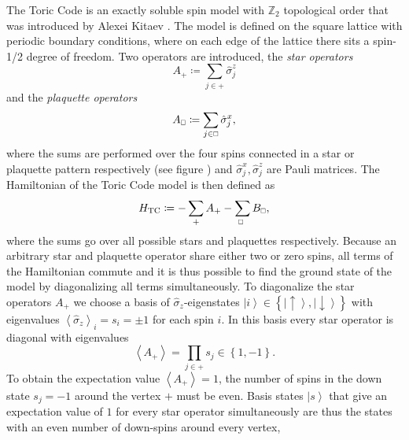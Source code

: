 The Toric Code is an exactly soluble spin model with $\mathbb{Z}_2$ topological order that was introduced by Alexei Kitaev \cite{cite:fault_tolerant_quantum_computation_by_anyons}. The model is defined on the square lattice with periodic boundary conditions, where on each edge of the lattice there sits a spin-1/2 degree of freedom. Two operators are introduced, the \textit{star operators}
\begin{equation}
	\label{eq:star_operator}
	A_+ \coloneqq \sum_{j\in+}\hat{\sigma}_j^z
\end{equation}
and the \textit{plaquette operators}
\begin{equation}
	\label{eq:plaquette_operator}
	A_{\scalebox{0.6}{$\square$}} \coloneqq \sum_{j\in \scalebox{0.6}{$\square$}} \hat{\sigma}_j^x,
\end{equation}
where the sums are performed over the four spins connected in a star or plaquette pattern respectively (see figure ) and $\hat{\sigma}_j^x, \hat{\sigma}_j^z$ are Pauli matrices. The Hamiltonian of the Toric Code model is then defined as
\begin{equation}
	\label{eq:toric_code_hamiltonian}
	H_\text{TC} \coloneqq -\sum_+A_+ - \sum_{\scalebox{0.6}{$\square$}}B_{\scalebox{0.6}{$\square$}},
\end{equation}
where the sums go over all possible stars and plaquettes respectively. Because an arbitrary star and plaquette operator share either two or zero spins, all terms of the Hamiltonian commute and it is thus possible to find the ground state of the model by diagonalizing all terms simultaneously. To diagonalize the star operators $A_+$ we choose a basis of $\hat{\sigma}_z$-eigenstates $\left|i\right\rangle \in \left\{\left|\uparrow\right\rangle, \left|\downarrow\right\rangle\right\}$ with eigenvalues $\left\langle\hat{\sigma}_z\right\rangle_i = s_i = \pm 1$ for each spin $i$. In this basis every star operator is diagonal with eigenvalues
\begin{equation}
	\label{eq:toric_code_star_operator_expectation value}
	\left\langle A_+\right\rangle = \prod_{j\in+}s_j \in \left\{1, -1\right\}.
\end{equation}
To obtain the expectation value $\left\langle A_+\right\rangle = 1$, the number of spins in the down state $s_j = -1$ around the vertex $+$ must be even. Basis states $\left|s\right\rangle$ that give an expectation value of $1$ for every star operator simultaneously are thus the states with an even number of down-spins around every vertex,
